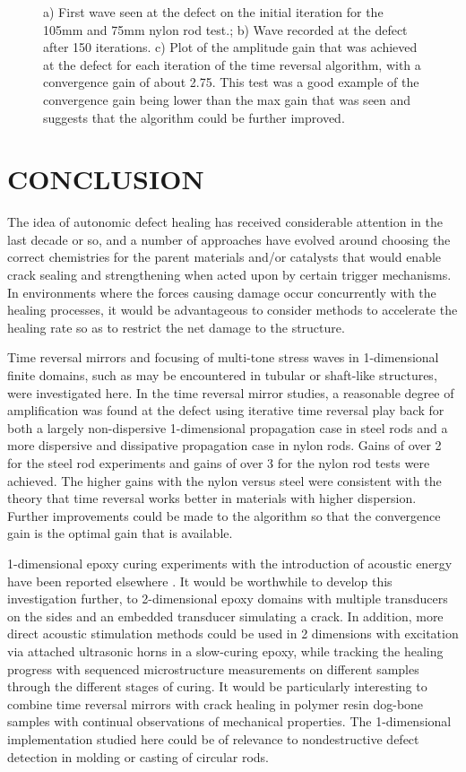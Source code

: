 \documentclass[11pt,letterpaper]{article}%
\begin{document}
\begin{figure}
   \caption[all]
   { \label{nylonExp3}
   a) First wave seen at the defect on the initial iteration for the 105mm and 75mm nylon rod test.; b) Wave recorded at the defect after 150 iterations. c) Plot of the amplitude gain that was achieved at the defect for each iteration of the time reversal algorithm, with a convergence gain of about 2.75. This test was a good example of the convergence gain being lower than the max gain that was seen and suggests that the algorithm could be further improved.
 }
\end{figure}


\section{CONCLUSION}
\label{sect:concl}

The idea of autonomic defect healing has received considerable
attention in the last decade or so, and a number of approaches
have evolved around choosing the correct chemistries for the
parent materials and/or catalysts that would enable crack sealing
and strengthening when acted upon by certain trigger mechanisms.
In environments where the forces causing damage occur concurrently
with the healing processes, it would be advantageous to consider
methods to accelerate the healing rate so as to restrict the net
damage to the structure.  

Time reversal mirrors and focusing of multi-tone stress waves in 1-dimensional
finite domains, such as may be encountered in tubular or
shaft-like structures, were investigated here. In the time reversal mirror studies, a reasonable degree of amplification was found at the defect using iterative
time reversal play back for both a largely non-dispersive
1-dimensional propagation case in steel rods and a more
dispersive and dissipative propagation case in nylon rods. Gains of over 2 for the steel rod experiments and gains of over 3 for the nylon rod tests were achieved. The higher gains with the nylon versus steel were consistent with the theory that time reversal works better in materials with higher dispersion. Further improvements could be made to the algorithm so that the convergence gain is the optimal gain that is available.

1-dimensional epoxy curing experiments with the introduction of acoustic energy have been reported elsewhere \cite{fehrman}.
It would be worthwhile to develop this investigation further, to
2-dimensional epoxy domains with multiple transducers on the sides
and an embedded transducer simulating a crack.  In addition, more
direct acoustic stimulation methods could be used in 2 dimensions
with excitation via attached ultrasonic horns in a slow-curing
epoxy, while tracking the healing progress with sequenced
microstructure measurements on different samples through the
different stages of curing.  It would be particularly interesting
to combine time reversal mirrors with crack healing in polymer
resin dog-bone samples with continual observations of mechanical
properties.  The 1-dimensional implementation studied here could
be of relevance to nondestructive defect detection in molding or
casting of circular rods.
\end{document}
